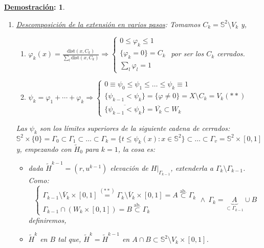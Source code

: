 \documentclass[10pt,a4paper,openright]{book}
\theoremstyle{break}
\newtheorem*{demo}{\underline{Demostración}:}
\begin{document}
\begin{demo}
\begin{enumerate}
    \item \underline{Descomposición de la extensión en varios pasos}: Tomamos $C_k = \mathbb{S}^{2} \setminus V_k$ y,
    \begin{enumerate}
        \item $\varphi_k\left( x \right) = \frac{\mathrm{dist} \left( x, C_k \right)}{\sum_{l} \mathrm{dist} \left( x, C_k \right)} \Rightarrow \begin{cases}
            0 \le \varphi_k \le 1\\
            \{\varphi_k = 0\} = C_k\\
            \sum_{l} \varphi_l = 1 
        \end{cases}$ por ser los $C_k$ cerrados.

        \item $\psi_k = \varphi_1 + \cdots + \varphi_k \Rightarrow \begin{cases}
            0 \equiv \psi_0 \le \psi_1 \le \ldots \le \psi_k \equiv 1\\
            \{\psi_{k - 1} < \psi_k\} = \{\varphi \neq 0\} = X \setminus C_k = V_k (**)\\
            \overline{\{\psi_{k - 1} < \psi_k\}} = \overline{V_k} \subset W_k
        \end{cases}$
    \end{enumerate}
    Las $\psi_k$ son los límites superiores de la siguiente cadena de cerrados:
    \[
    \mathbb{S}^{2} \times \{0\} = \Gamma_0 \subset \Gamma_1 \subset \ldots \subset \Gamma_k = \{t \le \psi_k\left( x \right) : x \in \mathbb{S}^{2}\} \subset  \ldots \subset \Gamma_v = \mathbb{S}^{2} \times \left[ 0, 1 \right] 
    \]
    y, empezando con $\tilde{H}_0$ para $k = 1$, la cosa es:
    \begin{itemize}
        \item dada $\tilde{H}^{k - 1} = \left( r, u^{k - 1} \right)$ elevación de $H|_{\Gamma_{k - 1}}$, extenderla a $\Gamma_k \setminus \Gamma_{k - 1}$. Como:
        \[
        \begin{cases}
            \Gamma_{k - 1} \setminus \overline{V}_k \times \left[ 0, 1 \right] \stackrel{(**)}{=} \Gamma_k \setminus \overline{V}_k \times \left[ 0, 1 \right] = A \stackrel{\text{ab.}}{\subset} \Gamma_k\\
            \Gamma_{k - 1} \cap \left( W_k \times \left[ 0, 1 \right] \right) = B \stackrel{\text{ab.}}{\subset} \Gamma_k
        \end{cases}\land\ \Gamma_k = \underbrace{A}_{\subset \Gamma_{k - 1}} \cup B
        \]
        definiremos,
        \item $\tilde{H}^k$ en $B$ tal que, $\tilde{H}^k = \tilde{H}^{k - 1}$ en $A \cap B \subset \mathbb{S}^{2} \setminus V_k \times \left[ 0, 1 \right]$.
    \end{itemize}


\end{enumerate}
\end{demo}
\end{document}
